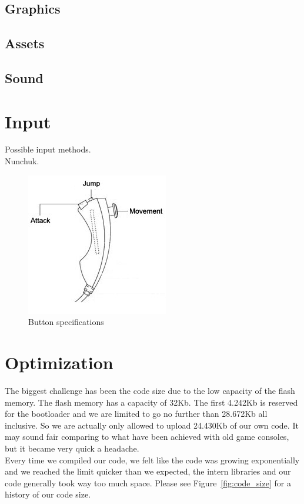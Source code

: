 \subsection{Graphics}
\subsection{Assets}
\subsection{Sound}

\section{Input}
Possible input methods.\\
Nunchuk.

\begin{figure}[h] 
  \centering 
  \includegraphics[scale=0.6]{Figures/nunchuk}
  \caption{Button specifications} 
  \label{fig:Nunchuk} 
\end{figure}

\section{Optimization}%
The biggest challenge has been the code size due to the low capacity of the flash memory.  The flash memory has a capacity of 32Kb. The first 4.242Kb is reserved for the bootloader and we are limited to go no further than 28.672Kb all inclusive. So we are actually only allowed to upload 24.430Kb of our own code. It may sound fair comparing to what have been achieved with old game consoles, but it became very quick a headache.\\
Every time we compiled our code, we felt like the code was growing exponentially and we reached the limit quicker than we expected, the intern libraries and our code generally took way too much space. Please see Figure~\ref{fig:code_size} for a history of our code size.

